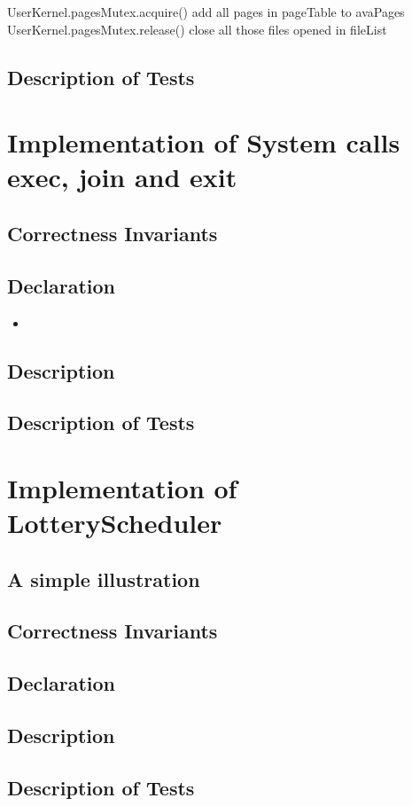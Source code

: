 \documentclass{article}
\begin{document}
    \begin{algorithm}[H]
		\begin{algorithmic}
			\State UserKernel.pagesMutex.acquire()
			\State add all pages in pageTable to avaPages
			\State UserKernel.pagesMutex.release()
			\State close all those files opened in fileList
			\EndProcedure
		\end{algorithmic}
	\end{algorithm}
	\subsection{Description of Tests}
	\section{Implementation of System calls exec, join and exit}
	\subsection{Correctness Invariants}
	\subsection{Declaration}
	\begin{itemize}
		\item 
	\end{itemize}
	\subsection{Description}
	\subsection{Description of Tests}
	\section{Implementation of LotteryScheduler}
	\subsection{A simple illustration}
	\subsection{Correctness Invariants}
	\subsection{Declaration}
	\subsection{Description}
	\subsection{Description of Tests}
\end{document}
